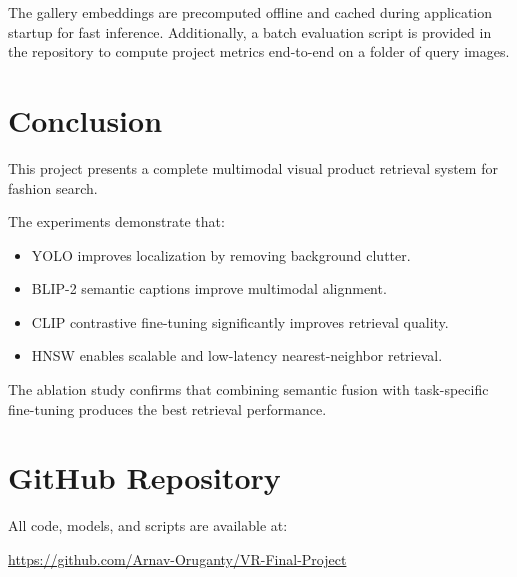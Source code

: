 \documentclass[12pt,a4paper]{article}
\begin{document}
The gallery embeddings are precomputed offline and cached during application
startup for fast inference. Additionally, a batch evaluation script is provided
in the repository to compute project metrics end-to-end on a folder of query images.

\section{Conclusion}

This project presents a complete multimodal visual product retrieval system
for fashion search.

The experiments demonstrate that:

\begin{itemize}[noitemsep]
    \item YOLO improves localization by removing background clutter.
    \item BLIP-2 semantic captions improve multimodal alignment.
    \item CLIP contrastive fine-tuning significantly improves retrieval
          quality.
    \item HNSW enables scalable and low-latency nearest-neighbor retrieval.
\end{itemize}

The ablation study confirms that combining semantic fusion with task-specific
fine-tuning produces the best retrieval performance.



\section*{GitHub Repository}

All code, models, and scripts are available at:

\url{https://github.com/Arnav-Oruganty/VR-Final-Project}
\end{document}
